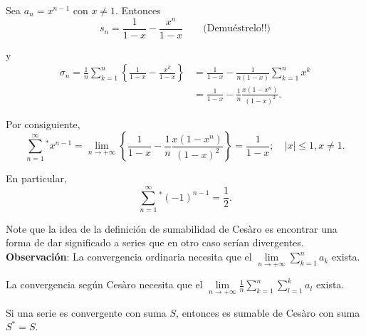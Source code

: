 \begin{ejemplo}
Sea $a_n = x^{n-1}$ con $x \neq 1$. Entonces
$$s_n = \frac{1}{1-x} - \frac{x^n}{1-x} \qquad \mbox{(Demuéstrelo!!)}$$

y
\begin{align*}
 \sigma_n = \frac{1}{n} \sum_{k=1}^n \left\{\frac{1}{1-x} - \frac{x^k}{1-x} \right\} &= \frac{1}{1-x} - \frac{1}{n(1-x)} \sum_{k =1}^{n} x^k   \\
 &=\frac{1}{1-x} -  \frac{1}{n} \frac{x(1-x^n)}{(1-x)^2}.
\end{align*}

Por consiguiente, 
$$\sum_{n=1}^{\infty}^* x^{n-1} = \lim_{n \to +\infty} \left\{ \frac{1}{1-x} -  \frac{1}{n} \frac{x(1-x^n)}{(1-x)^2}\right\} = \frac{1}{1-x}; \quad |x| \leq 1, x \neq 1. $$

En particular,
$$\sum_{n=1}^{\infty}^* (-1)^{n-1} = \frac{1}{2}.$$

\end{ejemplo}

Note que la idea de la definición de sumabilidad de Cesàro es encontrar una forma de dar significado a series que en otro caso serían divergentes.
\\

\textbf{Observación}: La convergencia ordinaria necesita que el $\lim\limits_{n \to + \infty} \sum\limits_{k = 1}^n a_{k}$ exista. 

\hspace{2.45cm} La convergencia según Cesàro necesita que el $\lim\limits_{n \to + \infty} \frac{1}{n} \sum\limits_{k = 1}^n  \sum\limits_{l = 1}^{k} a_{l}$ exista.

\begin{teorema}
Si una serie es convergente con suma $S$, entonces es sumable de Cesàro con suma $S^* = S$.
\end{teorema}

